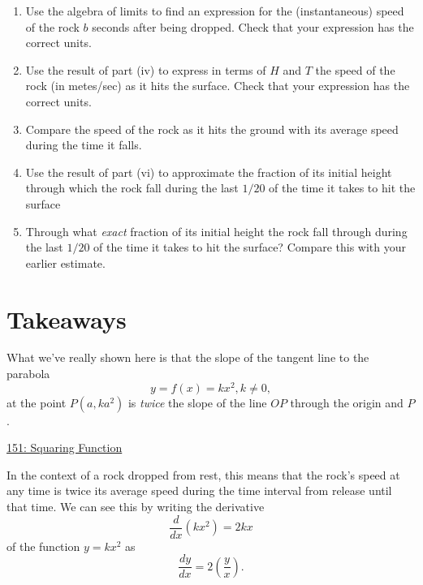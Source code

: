 \documentclass{ximera}
\begin{document}
\begin{question}
\begin{enumerate}
\begin{enumerate}
\item Use the algebra of limits to find an expression for the (instantaneous) speed of the rock $b$ seconds after being dropped. Check that your expression has the correct units.

\item Use the result of part (iv) to express in terms of $H$ and $T$ the speed of the rock (in metes/sec) as it hits the surface. Check that your expression has the correct units.

\item Compare the speed of the rock as it hits the ground with its average speed during the time it falls.

\item Use the result of part (vi) to approximate the fraction of its initial height through which the rock fall during the last $1/20$ of the time it takes to hit the surface

\item Through what \emph{exact} fraction of its initial height the rock fall through during the last $1/20$ of the time it takes to hit the surface? Compare this with your earlier estimate.

\end{enumerate}

\end{enumerate}


\end{question}


\section{Takeaways}

What we've really shown here is that the slope of the tangent line to the parabola
\[
     y=f(x) = kx^2 , k\neq 0,
\]
at the point $P(a,ka^2)$ is \emph{twice} the slope of the line $OP$ through the origin and $P$.

\begin{onlineOnly}
    \begin{center}
\end{center}
\end{onlineOnly}

\href{https://www.desmos.com/calculator/aamjtxiqgi}{151: Squaring Function}


In the context of a rock dropped from rest, this means that the rock's speed at any time is twice its average speed during the time interval from release until that time. We can see this by writing the derivative
\[
  \frac{d}{dx}\left(kx^2 \right) = 2kx
\] 
of the function $y=kx^2$ as
\[
    \frac{dy}{dx} = 2 \left(   \frac{y}{x}  \right) .
\]
\end{document}
